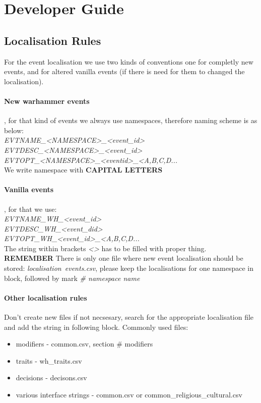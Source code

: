\documentclass[10pt, english]{article}
\author{Piotr<elminister@interia.pl>}
\begin{document}
\section{Developer Guide}
\subsection{Localisation Rules}
For the event localisation we use two kinds of conventions one for
completly new events, and for altered vanilla events (if there is need for them
to changed the localisation).
\paragraph{New warhammer events},
for that kind of events we always use namespaces, therefore 
naming scheme is as below: \\
\textit{EVTNAME\_<NAMESPACE>\_<event\_id>}
\\
\textit{EVTDESC\_<NAMESPACE>\_<event\_id>}
\\
\textit{EVTOPT\_<NAMESPACE>\_<eventid>\_<A,B,C,D...}\\
We write namespace with \textbf{CAPITAL LETTERS}

\paragraph{Vanilla events}, for that we use:\\
\textit{EVTNAME\_WH\_<event\_id>}
\\
\textit{EVTDESC\_WH\_<event\_did>}
\\
\textit{EVTOPT\_WH\_<event\_id>\_<A,B,C,D...}\\
The string within brackets \textit{<>} has to be filled with proper thing.\\
\textbf{REMEMBER}
There is only one file where new event localisation should be stored:
\textit{localisation\ events.csv}, please keep the localisations for
one namespace in block, followed by mark \textit{\# namespace name}
\\
\paragraph{Other localisation rules}
Don't create new files if not necsesary, search for the appropriate localisation file
and add the string in following block.
Commonly used files:
\begin{itemize}
\item modifiers - common.csv, section \# modifiers
\item traits - wh\_traits.csv
\item decisions - decisons.csv
\item various interface strings - common.csv or common\_religious\_cultural.csv
\end{itemize}
\end{document}
